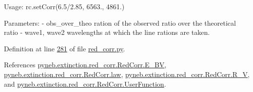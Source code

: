 \begin{DoxyVerb}
\begin{DoxyVerb}
Usage:
    rc.setCorr(6.5/2.85, 6563., 4861.)
    
Parameters:
    - obs_over_theo    ration of the observed ratio over the theoretical ratio
    - wave1, wave2     wavelengths at which the line rations are taken.\end{DoxyVerb}
 

Definition at line \hyperlink{red__corr_8py_source_l00281}{281} of file \hyperlink{red__corr_8py_source}{red\+\_\+corr.\+py}.



References \hyperlink{red__corr_8py_source_l00203}{pyneb.\+extinction.\+red\+\_\+corr.\+Red\+Corr.\+E\+\_\+\+B\+V}, \hyperlink{red__corr_8py_source_l00205}{pyneb.\+extinction.\+red\+\_\+corr.\+Red\+Corr.\+law}, \hyperlink{red__corr_8py_source_l00204}{pyneb.\+extinction.\+red\+\_\+corr.\+Red\+Corr.\+R\+\_\+\+V}, and \hyperlink{red__corr_8py_source_l00208}{pyneb.\+extinction.\+red\+\_\+corr.\+Red\+Corr.\+User\+Function}.



\end{DoxyVerb}
